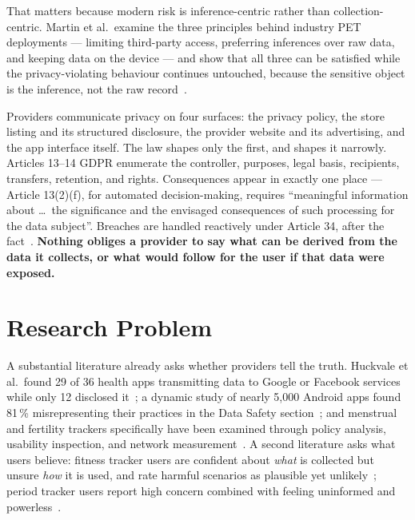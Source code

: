 \documentclass[10pt,a4paper]{article}
\begin{document}
That matters because modern risk is inference-centric rather than
collection-centric. Martin et al.\ examine the three principles behind industry
PET deployments --- limiting third-party access, preferring inferences over raw
data, and keeping data on the device --- and show that all three can be satisfied
while the privacy-violating behaviour continues untouched, because the sensitive
object is the inference, not the raw record~\parencite{martin2025cookies}.

Providers communicate privacy on four surfaces: the privacy policy, the store
listing and its structured disclosure, the provider website and its advertising,
and the app interface itself. The law shapes only the first, and shapes it
narrowly. Articles 13--14 GDPR enumerate the controller, purposes, legal basis,
recipients, transfers, retention, and rights. Consequences appear in exactly one
place --- Article 13(2)(f), for automated decision-making, requires
\enquote{meaningful information about \dots\ the significance and the envisaged
consequences of such processing for the data subject}. Breaches are handled
reactively under Article 34, after the fact~\parencite{gdpr2016}. \textbf{Nothing
obliges a provider to say what can be derived from the data it collects, or what
would follow for the user if that data were exposed.}

\section{Research Problem}

A substantial literature already asks whether providers tell the truth.
Huckvale et al.\ found 29 of 36 health apps transmitting data to Google or
Facebook services while only 12 disclosed it~\parencite{huckvale2019assessment};
a dynamic study of nearly 5{,}000 Android apps found 81\,\% misrepresenting
their practices in the Data Safety
section~\parencite{arkalakis2024abandon}; and menstrual and fertility trackers
specifically have been examined through policy analysis, usability inspection,
and network
measurement~\parencite{shipp2020period,malki2024exploring,hudig2025intimate}.
A second literature asks what users believe: fitness tracker users are confident
about \emph{what} is collected but unsure \emph{how} it is used, and rate
harmful scenarios as plausible yet unlikely~\parencite{gabriele2020understanding};
period tracker users report high concern combined with feeling uninformed and
powerless~\parencite{cao2024deleted}.
\end{document}
